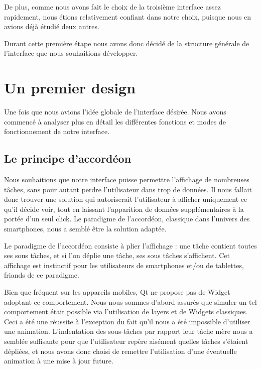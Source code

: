 \documentclass[11pt]{article}
\begin{document}
De plus, comme nous avons fait le choix de la troisième interface assez
rapidement, nous étions relativement confiant dans notre choix,
puisque nous en avions déjà étudié deux autres.

Durant cette première étape nous avons donc décidé de la structure
générale de l'interface que nous souhaitions développer.


\section{Un premier design}
\label{sec:premierDesign}

Une fois que nous avions l'idée globale de l'interface désirée. Nous
avons commencé à analyser plus en détail les différentes fonctions et
modes de fonctionnement de notre interface.


\subsection{Le principe d'accordéon}

Nous souhaitions que notre interface puisse permettre l'affichage de
nombreuses tâches, sans pour autant perdre l'utilisateur dans trop de
données. Il nous fallait donc trouver une solution qui autoriserait
l'utilisateur à afficher uniquement ce qu'il décide voir, tout en
laissant l'apparition de données supplémentaires à la portée d'un
seul click. Le paradigme de l'accordéon, classique dans l'univers des
smartphones, nous a semblé être la solution adaptée.

Le paradigme de l'accordéon consiste à plier l'affichage : une tâche
contient toutes ses sous tâches, et si l'on déplie une tâche, ses sous
tâches s'affichent. Cet affichage est instinctif pour les utilisateurs
de smartphones et/ou de tablettes, friands de ce paradigme.

Bien que fréquent sur les appareils mobiles, Qt ne propose pas de
Widget adoptant ce comportement. Nous nous sommes d'abord assurés que
simuler un tel comportement était possible via l'utilisation de layers
et de Widgets classiques. Ceci a été une réussite à l'exception du
fait qu'il nous a été impossible d'utiliser une
animation. L'indentation des sous-tâches par rapport leur tâche mère
nous a semblée suffisante pour que l'utilisateur repère aisément
quelles tâches s'étaient dépliées, et nous avons donc choisi de
remettre l'utilisation d'une éventuelle animation à une mise à jour
future. 
\end{document}
